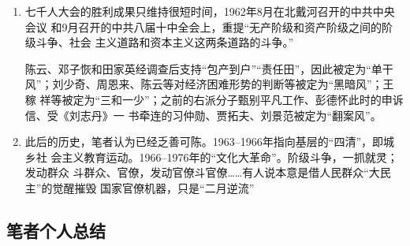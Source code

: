 \begin{enumerate}
\item 七千人大会的胜利成果只维持很短时间，1962年8月在北戴河召开的中共中央会议
  和9月召开的中共八届十中全会上，重提“无产阶级和资产阶级之间的阶级斗争、社会
  主义道路和资本主义这两条道路的斗争。”

  陈云、邓子恢和田家英经调查后支持“包产到户”“责任田”，因此被定为“单干
  风”；刘少奇、周恩来、陈云等对经济困难形势的判断等被定为“黑暗风”；王稼
  祥等被定为“三和一少”；之前的右派分子甄别平凡工作、彭德怀此时的申诉信、受《刘志丹》一
  书牵连的习仲勋、贾拓夫、刘景范被定为“翻案风”。

\item 此后的历史，笔者认为已经乏善可陈。1963--1966年指向基层的“四清”，即城乡社
  会主义教育运动。1966--1976年的“文化大革命”。阶级斗争，一抓就灵；发动群众
  斗群众、官僚，发动官僚斗官僚……有人说本意是借人民群众“大民主”的觉醒摧毁
  国家官僚机器，只是“二月逆流”
\end{enumerate}

\subsection{笔者个人总结}

